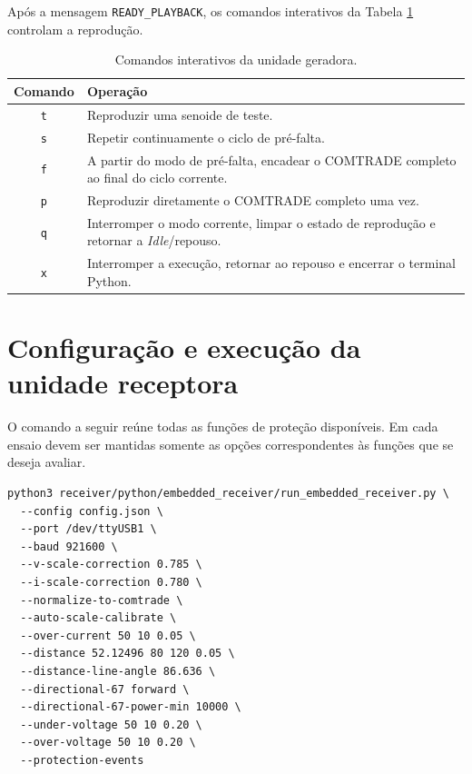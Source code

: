 Após a mensagem \texttt{READY\_PLAYBACK}, os comandos interativos da Tabela \ref{tab:ap-comandos-gerador} controlam a reprodução.

\begin{table}[H]
  \centering
  \small
  \caption{Comandos interativos da unidade geradora.}
  \label{tab:ap-comandos-gerador}
  \begin{tabular}{cp{11.5cm}}
    \toprule
    Comando & Operação \\
    \midrule
    \texttt{t} & Reproduzir uma senoide de teste. \\
    \texttt{s} & Repetir continuamente o ciclo de pré-falta. \\
    \texttt{f} & A partir do modo de pré-falta, encadear o COMTRADE completo ao final do ciclo corrente. \\
    \texttt{p} & Reproduzir diretamente o COMTRADE completo uma vez. \\
    \texttt{q} & Interromper o modo corrente, limpar o estado de reprodução e retornar a \textit{Idle}/repouso. \\
    \texttt{x} & Interromper a execução, retornar ao repouso e encerrar o terminal Python. \\
    \bottomrule
  \end{tabular}
\end{table}

\section{Configuração e execução da unidade receptora}

O comando a seguir reúne todas as funções de proteção disponíveis. Em cada ensaio devem ser mantidas somente as opções correspondentes às funções que se deseja avaliar.

\begin{verbatim}
python3 receiver/python/embedded_receiver/run_embedded_receiver.py \
  --config config.json \
  --port /dev/ttyUSB1 \
  --baud 921600 \
  --v-scale-correction 0.785 \
  --i-scale-correction 0.780 \
  --normalize-to-comtrade \
  --auto-scale-calibrate \
  --over-current 50 10 0.05 \
  --distance 52.12496 80 120 0.05 \
  --distance-line-angle 86.636 \
  --directional-67 forward \
  --directional-67-power-min 10000 \
  --under-voltage 50 10 0.20 \
  --over-voltage 50 10 0.20 \
  --protection-events
\end{verbatim}


